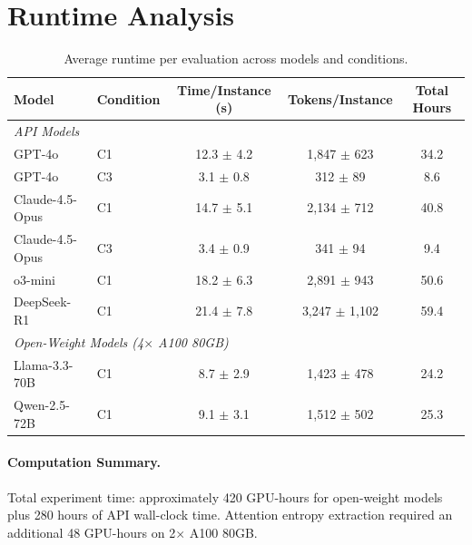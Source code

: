 \documentclass{article}
\theoremstyle{plain}
\theoremstyle{definition}
\theoremstyle{remark}
\begin{document}

\section{Runtime Analysis}
\label{app:runtime}

\begin{table}[h]
\centering
\caption{Average runtime per evaluation across models and conditions.}
\label{tab:runtime}
\small
\begin{tabular}{@{}llccc@{}}
\toprule
\textbf{Model} & \textbf{Condition} & \textbf{Time/Instance (s)} & \textbf{Tokens/Instance} & \textbf{Total Hours} \\
\midrule
\multicolumn{5}{l}{\textit{API Models}} \\
GPT-4o & C1 & 12.3 $\pm$ 4.2 & 1,847 $\pm$ 623 & 34.2 \\
GPT-4o & C3 & 3.1 $\pm$ 0.8 & 312 $\pm$ 89 & 8.6 \\
Claude-4.5-Opus & C1 & 14.7 $\pm$ 5.1 & 2,134 $\pm$ 712 & 40.8 \\
Claude-4.5-Opus & C3 & 3.4 $\pm$ 0.9 & 341 $\pm$ 94 & 9.4 \\
o3-mini & C1 & 18.2 $\pm$ 6.3 & 2,891 $\pm$ 943 & 50.6 \\
DeepSeek-R1 & C1 & 21.4 $\pm$ 7.8 & 3,247 $\pm$ 1,102 & 59.4 \\
\midrule
\multicolumn{5}{l}{\textit{Open-Weight Models (4$\times$ A100 80GB)}} \\
Llama-3.3-70B & C1 & 8.7 $\pm$ 2.9 & 1,423 $\pm$ 478 & 24.2 \\
Qwen-2.5-72B & C1 & 9.1 $\pm$ 3.1 & 1,512 $\pm$ 502 & 25.3 \\
\bottomrule
\end{tabular}
\end{table}

\paragraph{Computation Summary.} Total experiment time: approximately 420 GPU-hours for open-weight models plus 280 hours of API wall-clock time. Attention entropy extraction required an additional 48 GPU-hours on 2$\times$ A100 80GB.


\end{document}

